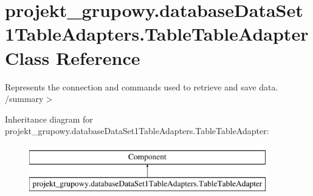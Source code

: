 \hypertarget{classprojekt__grupowy_1_1database_data_set1_table_adapters_1_1_table_table_adapter}{}\section{projekt\+\_\+grupowy.\+database\+Data\+Set1\+Table\+Adapters.\+Table\+Table\+Adapter Class Reference}
\label{classprojekt__grupowy_1_1database_data_set1_table_adapters_1_1_table_table_adapter}


Represents the connection and commands used to retrieve and save data. /summary$>$  


Inheritance diagram for projekt\+\_\+grupowy.\+database\+Data\+Set1\+Table\+Adapters.\+Table\+Table\+Adapter\+:\begin{figure}[H]
\begin{center}
\leavevmode
\includegraphics[height=2.000000cm]{classprojekt__grupowy_1_1database_data_set1_table_adapters_1_1_table_table_adapter}
\end{center}
\end{figure}
